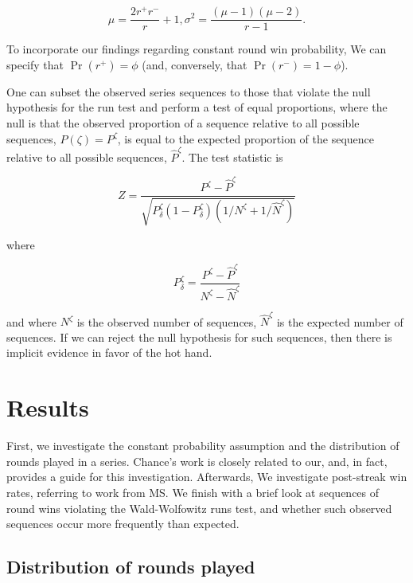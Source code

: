 \documentclass{article}
\begin{document}
\begin{equation}\label{eq:ww}
\mu = \frac{2r^{+}r^{-}}{r} + 1, \sigma^2 = \frac{(\mu-1)(\mu-2)}{r-1}.
\end{equation}

To incorporate our findings regarding constant round win probability, We
can specify that \(\Pr(r^+) = \phi\) (and, conversely, that
\(\Pr(r^-) = 1 - \phi\)).

One can subset the observed series sequences to those that violate the
null hypothesis for the run test and perform a test of equal
proportions, where the null is that the observed proportion of a
sequence relative to all possible sequences, \(P(\zeta) = P^\zeta\), is
equal to the expected proportion of the sequence relative to all
possible sequences, \(\hat{P}^\zeta\). The test statistic is

\begin{equation}\label{eq:prop}
Z = \frac{P^\zeta - \hat{P}^\zeta}{\sqrt{P^\zeta_{\delta} (1 - P^\zeta_{\delta}) (1 / N^\zeta + 1 / \hat{N}^\zeta)  } }
\end{equation}

where

\[
P^\zeta_{\delta} = \frac{P^\zeta - \hat{P}^\zeta}{N^\zeta - \hat{N}^\zeta}
\]

and where \(N^\zeta\) is the observed number of sequences,
\(\hat{N}^\zeta\) is the expected number of sequences. If we can reject
the null hypothesis for such sequences, then there is implicit evidence
in favor of the hot hand.

\hypertarget{results}{%
\section{Results}\label{results}}

First, we investigate the constant probability assumption and the
distribution of rounds played in a series. Chance's work is closely
related to our, and, in fact, provides a guide for this investigation.
Afterwards, We investigate post-streak win rates, referring to work from
MS. We finish with a brief look at sequences of round wins violating the
Wald-Wolfowitz runs test, and whether such observed sequences occur more
frequently than expected.

\hypertarget{distribution-of-rounds-played-1}{%
\subsection{Distribution of rounds
played}\label{distribution-of-rounds-played-1}}
\end{document}

